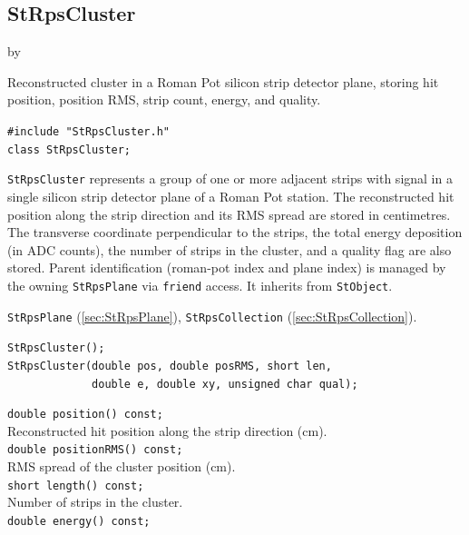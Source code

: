 \documentclass[twoside]{article}
\newcommand{\entrylabel}[1]{\mbox{\textbf{{#1}}}\hfil}%
\newenvironment{entry}
{\begin{list}{}%
    {\renewcommand{\makelabel}{\entrylabel}%
     \setlength{\labelwidth}{90pt}%
     \setlength{\leftmargin}{\labelwidth}
     \advance\leftmargin by \labelsep%
      }%
    }%
  {\end{list}}
\newcommand{\Entrylabel}[1]%
{\raisebox{0pt}[1ex][0pt]{\makebox[\labelwidth][l]%
    {\parbox[t]{\labelwidth}{\hspace{0pt}\textbf{{#1}}}}}}
\newenvironment{Entry}%
{\renewcommand{\entrylabel}{\Entrylabel}\begin{entry}}%
  {\end{entry}}
\begin{document}
\subsection{StRpsCluster}
\label{sec:StRpsCluster}
\begin{Entry}
\item[Summary] Reconstructed cluster in a Roman Pot silicon strip detector plane,
    storing hit position, position RMS, strip count, energy, and quality.
\item[Synopsis]
    \verb+#include "StRpsCluster.h"+\\
    \verb+class StRpsCluster;+\\
\item[Description]
    \texttt{StRpsCluster} represents a group of one or more adjacent strips with
    signal in a single silicon strip detector plane of a Roman Pot station.
    The reconstructed hit position along the strip direction and its RMS spread
    are stored in centimetres.  The transverse coordinate perpendicular to the
    strips, the total energy deposition (in ADC counts), the number of strips in
    the cluster, and a quality flag are also stored.
    Parent identification (roman-pot index and plane index) is managed by the
    owning \texttt{StRpsPlane} via \texttt{friend} access.
    It inherits from \texttt{StObject}.
\item[Related Classes]
    \texttt{StRpsPlane} (\ref{sec:StRpsPlane}),
    \texttt{StRpsCollection} (\ref{sec:StRpsCollection}).
\item[Public\\ Constructors]
    \verb+StRpsCluster();+\\
    \verb+StRpsCluster(double pos, double posRMS, short len,+\\
    \verb+             double e, double xy, unsigned char qual);+\\
\item[Public Member\\ Functions]
    \verb+double position() const;+\\
    Reconstructed hit position along the strip direction (cm).\\
    \verb+double positionRMS() const;+\\
    RMS spread of the cluster position (cm).\\
    \verb+short length() const;+\\
    Number of strips in the cluster.\\
    \verb+double energy() const;+\\

\end{Entry}
\end{document}
